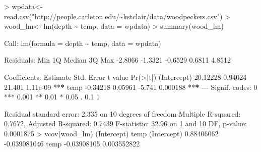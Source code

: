 \documentclass[
]{article}
\newenvironment{Shaded}{\begin{snugshade}}{\end{snugshade}}
\newcommand{\AttributeTok}[1]{\textcolor[rgb]{0.77,0.63,0.00}{#1}}
\newcommand{\DecValTok}[1]{\textcolor[rgb]{0.00,0.00,0.81}{#1}}
\newcommand{\ErrorTok}[1]{\textcolor[rgb]{0.64,0.00,0.00}{\textbf{#1}}}
\newcommand{\FloatTok}[1]{\textcolor[rgb]{0.00,0.00,0.81}{#1}}
\newcommand{\FunctionTok}[1]{\textcolor[rgb]{0.00,0.00,0.00}{#1}}
\newcommand{\NormalTok}[1]{#1}
\newcommand{\OtherTok}[1]{\textcolor[rgb]{0.56,0.35,0.01}{#1}}
\newcommand{\SpecialCharTok}[1]{\textcolor[rgb]{0.00,0.00,0.00}{#1}}
\newcommand{\StringTok}[1]{\textcolor[rgb]{0.31,0.60,0.02}{#1}}
\begin{document}
\begin{Shaded}
\begin{Highlighting}[]
\SpecialCharTok{\textgreater{}}\NormalTok{ wpdata}\OtherTok{\textless{}{-}} \FunctionTok{read.csv}\NormalTok{(}\StringTok{"http://people.carleton.edu/\textasciitilde{}kstclair/data/woodpeckers.csv"}\NormalTok{)}
\SpecialCharTok{\textgreater{}}\NormalTok{ wood\_lm}\OtherTok{\textless{}{-}} \FunctionTok{lm}\NormalTok{(depth }\SpecialCharTok{\textasciitilde{}}\NormalTok{ temp, }\AttributeTok{data =}\NormalTok{ wpdata)}
\SpecialCharTok{\textgreater{}} \FunctionTok{summary}\NormalTok{(wood\_lm)}

\NormalTok{Call}\SpecialCharTok{:}
\FunctionTok{lm}\NormalTok{(}\AttributeTok{formula =}\NormalTok{ depth }\SpecialCharTok{\textasciitilde{}}\NormalTok{ temp, }\AttributeTok{data =}\NormalTok{ wpdata)}

\NormalTok{Residuals}\SpecialCharTok{:}
\NormalTok{    Min      1Q  Median      3Q     Max }
\SpecialCharTok{{-}}\FloatTok{2.8066} \SpecialCharTok{{-}}\FloatTok{1.3321} \SpecialCharTok{{-}}\FloatTok{0.6529}  \FloatTok{0.6811}  \FloatTok{4.8512} 

\NormalTok{Coefficients}\SpecialCharTok{:}
\NormalTok{            Estimate Std. Error t value }\FunctionTok{Pr}\NormalTok{(}\SpecialCharTok{\textgreater{}}\ErrorTok{|}\NormalTok{t}\SpecialCharTok{|}\NormalTok{)    }
\NormalTok{(Intercept) }\FloatTok{20.12228}    \FloatTok{0.94024}  \FloatTok{21.401} \FloatTok{1.11e{-}09} \SpecialCharTok{**}\ErrorTok{*}
\NormalTok{temp        }\SpecialCharTok{{-}}\FloatTok{0.34218}    \FloatTok{0.05961}  \SpecialCharTok{{-}}\FloatTok{5.741} \FloatTok{0.000188} \SpecialCharTok{**}\ErrorTok{*}
\SpecialCharTok{{-}{-}{-}}
\NormalTok{Signif. codes}\SpecialCharTok{:}  \DecValTok{0} \StringTok{\textquotesingle{}***\textquotesingle{}} \FloatTok{0.001} \StringTok{\textquotesingle{}**\textquotesingle{}} \FloatTok{0.01} \StringTok{\textquotesingle{}*\textquotesingle{}} \FloatTok{0.05} \StringTok{\textquotesingle{}.\textquotesingle{}} \FloatTok{0.1} \StringTok{\textquotesingle{} \textquotesingle{}} \DecValTok{1}

\NormalTok{Residual standard error}\SpecialCharTok{:} \FloatTok{2.335}\NormalTok{ on }\DecValTok{10}\NormalTok{ degrees of freedom}
\NormalTok{Multiple R}\SpecialCharTok{{-}}\NormalTok{squared}\SpecialCharTok{:}  \FloatTok{0.7672}\NormalTok{,    Adjusted R}\SpecialCharTok{{-}}\NormalTok{squared}\SpecialCharTok{:}  \FloatTok{0.7439} 
\NormalTok{F}\SpecialCharTok{{-}}\NormalTok{statistic}\SpecialCharTok{:} \FloatTok{32.96}\NormalTok{ on }\DecValTok{1}\NormalTok{ and }\DecValTok{10}\NormalTok{ DF,  p}\SpecialCharTok{{-}}\NormalTok{value}\SpecialCharTok{:} \FloatTok{0.0001875}
\SpecialCharTok{\textgreater{}} \FunctionTok{vcov}\NormalTok{(wood\_lm)}
\NormalTok{            (Intercept)         temp}
\NormalTok{(Intercept)  }\FloatTok{0.88406062} \SpecialCharTok{{-}}\FloatTok{0.039081046}
\NormalTok{temp        }\SpecialCharTok{{-}}\FloatTok{0.03908105}  \FloatTok{0.003552822}
\end{Highlighting}
\end{Shaded}
\end{document}
